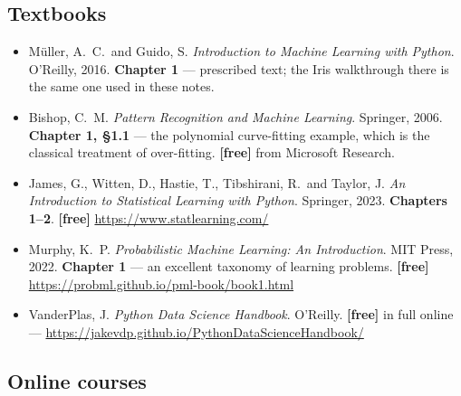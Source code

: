 \documentclass[11pt]{article}
\begin{document}
\subsection*{Textbooks}

\begin{itemize}[leftmargin=*]
  \item M\"uller, A.\ C.\ and Guido, S. \emph{Introduction to Machine Learning
    with Python}. O'Reilly, 2016. \textbf{Chapter 1} --- prescribed text; the
    Iris walkthrough there is the same one used in these notes.
  \item Bishop, C.\ M. \emph{Pattern Recognition and Machine Learning}.
    Springer, 2006. \textbf{Chapter 1, \S1.1} --- the polynomial curve-fitting
    example, which is the classical treatment of over-fitting.
    \textbf{[free]} from Microsoft Research.
  \item James, G., Witten, D., Hastie, T., Tibshirani, R.\ and Taylor, J.
    \emph{An Introduction to Statistical Learning with Python}. Springer, 2023.
    \textbf{Chapters 1--2}. \textbf{[free]} \url{https://www.statlearning.com/}
  \item Murphy, K.\ P. \emph{Probabilistic Machine Learning: An Introduction}.
    MIT Press, 2022. \textbf{Chapter 1} --- an excellent taxonomy of learning
    problems. \textbf{[free]} \url{https://probml.github.io/pml-book/book1.html}
  \item VanderPlas, J. \emph{Python Data Science Handbook}. O'Reilly.
    \textbf{[free]} in full online ---
    \url{https://jakevdp.github.io/PythonDataScienceHandbook/}
\end{itemize}

\subsection*{Online courses}
\end{document}
